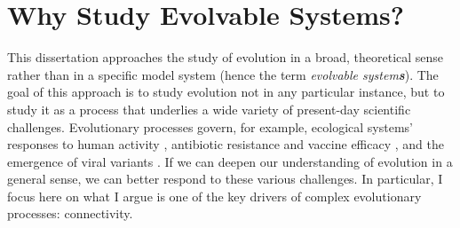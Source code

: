 \section{Why Study Evolvable Systems?}

This dissertation approaches the study of evolution in a broad, theoretical sense rather than in a specific model system (hence the term \textit{evolvable system\textbf{s}}). The goal of this approach is to study evolution not in any particular instance, but to study it as a process that underlies a wide variety of present-day scientific challenges. Evolutionary processes govern, for example, ecological systems' responses to human activity \citep{nadeau_ecoevolution_2019},  antibiotic resistance and vaccine efficacy \citep{davies_origins_2010, kennedy_why_2018}, and the emergence of viral variants \citep{rochman_ongoing_2021, cobey_concerns_2021}. If we can deepen our understanding of evolution in a general sense, we can better respond to these various challenges. In particular, I focus here on what I argue is one of the key drivers of complex evolutionary processes: connectivity. 
